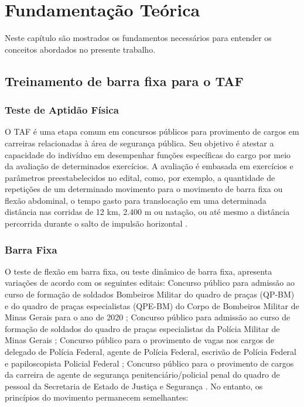 \chapter{Fundamentação Teórica}
Neste capítulo são mostrados os fundamentos necessários para entender os conceitos abordados no presente trabalho.


\section[Treinamento de barra fixa para o TAF]{Treinamento de barra fixa para o TAF}\label{sec:Treinamento de barra fixa para o TAF}

\subsection[Teste de Aptidão Física]{Teste de Aptidão Física}\label{sec:Teste de Aptidão Física}

O \ac{TAF} é uma etapa comum em concursos públicos para provimento de cargos em carreiras relacionadas à área de segurança pública. Seu objetivo é atestar a capacidade do indivíduo em desempenhar funções específicas do cargo por meio da avaliação de determinados exercícios. A avaliação é embasada em exercícios e parâmetros preestabelecidos no edital, como, por exemplo, a quantidade de repetições de um determinado movimento para o movimento de barra fixa ou flexão abdominal, o tempo gasto para translocação em uma determinada distância nas corridas de 12 km, 2.400 m ou natação, ou até mesmo a distância percorrida durante o salto de impulsão horizontal \cite{TAF_adv}.

\subsection[Barra Fixa]{Barra Fixa}\label{sec:Barra Fixa}

O teste de flexão em barra fixa, ou teste dinâmico de barra fixa, apresenta variações de acordo com os seguintes editais: Concurso público para admissão ao curso de formação de soldados Bombeiros Militar do quadro de praças (QP-BM) e do quadro de praças especialistas (QPE-BM) do Corpo de Bombeiros Militar de Minas Gerais para o ano de 2020 \cite{eCBMG2018}; Concurso público para admissão ao curso de formação de soldados do quadro de praças especialistas da Polícia Militar de Minas Gerais \cite{ePMMG2021}; Concurso público para o provimento de vagas nos cargos de delegado de Polícia Federal, agente de Polícia Federal, escrivão de Polícia Federal e papiloscopista Policial Federal \cite{ePF2021}; Concurso público para o provimento de cargos da carreira de agente de segurança penitenciário/policial penal do quadro de pessoal da Secretaria de Estado de Justiça e Segurança \cite{ePP2021}. No entanto, os princípios do movimento permanecem semelhantes:

